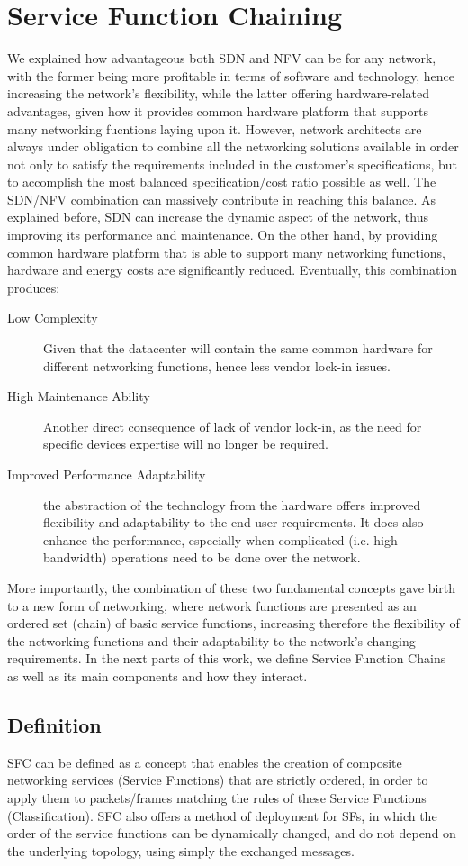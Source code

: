 \section{Service Function Chaining \cite{nano3}}
We explained how advantageous both SDN and NFV can be for any network, with the former being more profitable in terms of software and technology, hence increasing the network’s flexibility, while the latter offering hardware-related advantages, given how it provides common hardware
platform that supports many networking fucntions laying upon it. However, network architects are always under obligation to combine all the networking solutions available in order not only to satisfy the requirements included in the customer’s specifications, but to accomplish the most balanced specification/cost ratio possible as well. The SDN/NFV combination can massively contribute in reaching this balance. As explained before, SDN can increase the dynamic aspect of the network, thus improving its performance and maintenance. On the other hand, by providing common hardware platform that is able to support many networking functions, hardware and energy costs are significantly reduced. Eventually, this combination produces:
\begin{description}
\item[Low Complexity] Given that the datacenter will contain the same common hardware for different networking functions, hence less vendor lock-in issues. 
\item[High Maintenance Ability] Another direct consequence of lack of vendor lock-in, as the need for specific devices expertise will no longer be required.
\item[Improved Performance Adaptability] the abstraction of the technology from the hardware offers improved flexibility and adaptability to the end user requirements. It does also enhance the performance, especially when complicated (i.e. high bandwidth) operations need to be done over the network.
\end{description}
More importantly, the combination of these two fundamental concepts gave birth to a new form of networking, where network functions are presented as an ordered set (chain) of basic service functions, increasing therefore the flexibility of the networking functions and their adaptability to the network’s changing requirements. In the next parts of this work, we define Service Function Chains as well as its main components and how they interact.
\subsection{Definition}
SFC can be defined as a concept that enables the creation of composite networking services (Service Functions) that are strictly ordered, in order to apply them to packets/frames matching the rules of these Service Functions
(Classification). SFC also offers a method of deployment for SFs, in which the order of the service functions can be dynamically changed, and do not depend on the underlying topology, using simply the exchanged messages.
